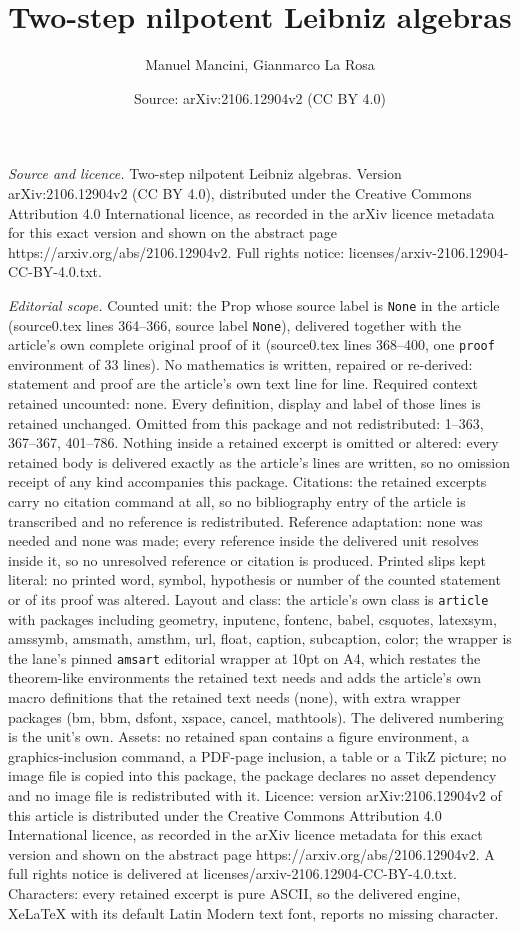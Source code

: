 \documentclass[10pt,a4paper]{amsart}
\title[Two-step nilpotent Leibniz algebras]{Two-step nilpotent Leibniz algebras}
\author{Manuel Mancini, Gianmarco La Rosa}
\date{Source: arXiv:2106.12904v2 (CC BY 4.0)}
\begin{document}
\maketitle

\noindent\emph{Source and licence.} Two-step nilpotent Leibniz algebras. Version arXiv:2106.12904v2 (CC BY 4.0), distributed under the Creative Commons Attribution 4.0 International licence, as recorded in the arXiv licence metadata for this exact version and shown on the abstract page https://arxiv.org/abs/2106.12904v2. Full rights notice: licenses/arxiv-2106.12904-CC-BY-4.0.txt.\par\smallskip

\noindent\textit{Editorial scope.} Counted unit: the Prop whose source label is \texttt{None} in the article (source0.tex lines 364--366, source label \texttt{None}), delivered together with the article's own complete original proof of it (source0.tex lines 368--400, one \texttt{proof} environment of 33 lines). No mathematics is written, repaired or re-derived: statement and proof are the article's own text line for line. Required context retained uncounted: none. Every definition, display and label of those lines is retained unchanged. Omitted from this package and not redistributed: 1--363, 367--367, 401--786. Nothing inside a retained excerpt is omitted or altered: every retained body is delivered exactly as the article's lines are written, so no omission receipt of any kind accompanies this package. Citations: the retained excerpts carry no citation command at all, so no bibliography entry of the article is transcribed and no reference is redistributed. Reference adaptation: none was needed and none was made; every reference inside the delivered unit resolves inside it, so no unresolved reference or citation is produced. Printed slips kept literal: no printed word, symbol, hypothesis or number of the counted statement or of its proof was altered. Layout and class: the article's own class is \texttt{article} with packages including geometry, inputenc, fontenc, babel, csquotes, latexsym, amssymb, amsmath, amsthm, url, float, caption, subcaption, color; the wrapper is the lane's pinned \texttt{amsart} editorial wrapper at 10pt on A4, which restates the theorem-like environments the retained text needs and adds the article's own macro definitions that the retained text needs (none), with extra wrapper packages (bm, bbm, dsfont, xspace, cancel, mathtools). The delivered numbering is the unit's own. Assets: no retained span contains a figure environment, a graphics-inclusion command, a PDF-page inclusion, a table or a TikZ picture; no image file is copied into this package, the package declares no asset dependency and no image file is redistributed with it. Licence: version arXiv:2106.12904v2 of this article is distributed under the Creative Commons Attribution 4.0 International licence, as recorded in the arXiv licence metadata for this exact version and shown on the abstract page https://arxiv.org/abs/2106.12904v2. A full rights notice is delivered at licenses/arxiv-2106.12904-CC-BY-4.0.txt. Characters: every retained excerpt is pure ASCII, so the delivered engine, XeLaTeX with its default Latin Modern text font, reports no missing character.
\end{document}
